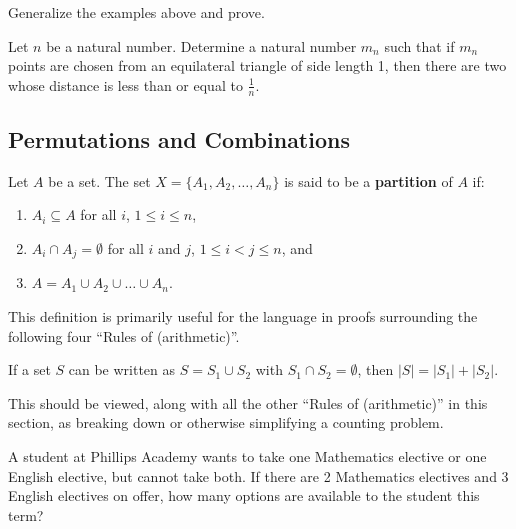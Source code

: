 \begin{exercise} Generalize the examples above and prove.
\end{exercise}

\begin{example} Let $n$ be a natural number. Determine a natural number $m_n$ such that if $m_n$ points are chosen from an equilateral triangle of side length 1, then there are two whose distance is less than or equal to $\frac{1}{n}$.
\end{example}

\subsection{Permutations and Combinations}
\begin{definition}  Let $A$ be a set.  The set $X=\{A_1, A_2, \ldots, A_n\}$ is said to be a \textbf{partition} of $A$ if:
\begin{enumerate}
    \item $A_i \subseteq A$ for all $i$, $1\leq i \leq n$,
    \item $A_i \cap A_j = \emptyset$ for all $i$ and $j$, $1 \leq i < j \leq n$, and
    \item $A = A_1 \cup A_2 \cup \ldots \cup A_n$.
\end{enumerate}

This definition is primarily useful for the language in proofs surrounding the following four ``Rules of (arithmetic)''.

\end{definition}

\begin{theorem} If a set $S$ can be written as $S = S_1 \cup S_2$ with $S_1 \cap S_2 = \emptyset$, then $|S| = |S_1| + |S_2|$.
\end{theorem}

\begin{remark} This should be viewed, along with all the other ``Rules of (arithmetic)'' in this section, as breaking down or otherwise simplifying a counting problem.
\end{remark}

\begin{example} A student at Phillips Academy wants to take one Mathematics elective or one English elective, but cannot take both.  If there are 2 Mathematics electives and 3 English electives on offer, how many options are available to the student this term?
\end{example}

